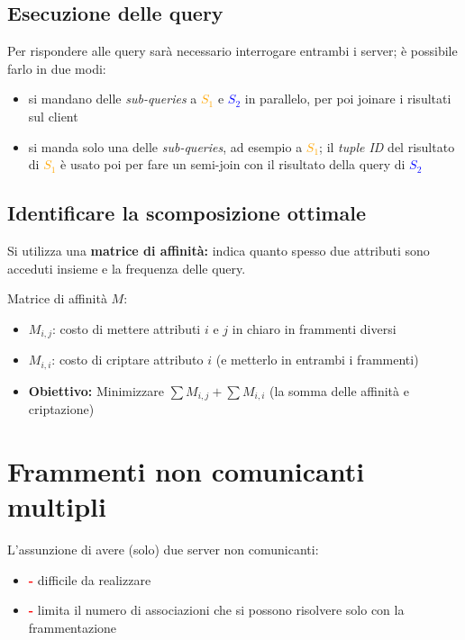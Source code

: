 \documentclass{report}
\begin{document}
\subsection{Esecuzione delle query}
Per rispondere alle query sarà necessario interrogare entrambi i server; è possibile farlo 
in due modi:
\begin{itemize}
    \item si mandano delle \textit{sub-queries} a \textcolor{orange}{$S_1$} e \textcolor{blue}{$S_2$} in parallelo, per poi 
    joinare i risultati sul client 
    \item si manda solo una delle \textit{sub-queries}, ad esempio a \textcolor{orange}{$S_1$}; il \textit{tuple ID} del risultato 
    di \textcolor{orange}{$S_1$} è usato poi per fare un semi-join con il risultato della query di \textcolor{blue}{$S_2$}
\end{itemize}

\subsection{Identificare la scomposizione ottimale}
Si utilizza una \textbf{matrice di affinità:} indica quanto spesso due attributi 
sono acceduti insieme e la frequenza delle query.

\noindent Matrice di affinità $M$:
\begin{itemize}
    \item $M_{i,j}$: costo di mettere attributi $i$ e $j$ in chiaro in frammenti diversi 
    \item $M_{i,i}$: costo di criptare attributo $i$ (e metterlo in entrambi i frammenti)
    \item \textbf{Obiettivo:} Minimizzare $\sum M_{i,j} + \sum M_{i,i}$ (la somma delle affinità e criptazione)
\end{itemize}

\newpage
\section{Frammenti non comunicanti multipli}
L'assunzione di avere (solo) due server non comunicanti:
\begin{itemize}
    \item \textcolor{red}{\textbf{-}} difficile da realizzare 
    \item \textcolor{red}{\textbf{-}} limita il numero di associazioni che si possono risolvere solo con la frammentazione
\end{itemize}
\end{document}
